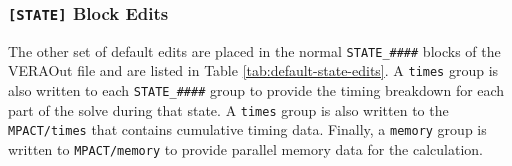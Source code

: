 \FloatBarrier

\subsubsection{\texttt{[STATE]} Block Edits}

The other set of default edits are placed in the normal \texttt{STATE\_\#\#\#\#} blocks of the VERAOut file and  are listed in Table \ref{tab:default-state-edits}. A \texttt{times} group is also written to each \texttt{STATE\_\#\#\#\#} group to provide the timing breakdown for each part of the solve during that state.  A \texttt{times} group is also written to the \texttt{MPACT/times} that contains cumulative timing data.  Finally, a \texttt{memory} group is written to \texttt{MPACT/memory} to provide parallel memory data for the calculation.


